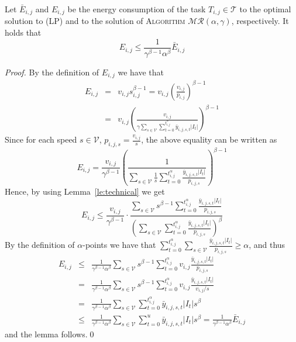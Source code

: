 \documentclass{llncs}
\newcommand{\algomr}{\textsc{Algorithm} $\mathcal{MR}(\alpha,\gamma)$\xspace}
\begin{document}
\begin{lemma}\label{le:speed}
Let $\bar{E}_{i,j}$ and $E_{i,j}$ be the energy consumption of the task $T_{i,j}\in \mathcal{T}$
to the optimal solution to (LP) and to the solution of \algomr, respectively.
It holds that
\begin{equation*}
E_{i,j}\leq \frac{1}{\gamma^{\beta-1}\alpha^{\beta}} \bar{E}_{i,j}
\end{equation*}
\end{lemma}
\begin{proof}
By the definition of $E_{i,j}$ we have that
\begin{eqnarray*}
E_{i,j} & = & v_{i,j}s_{i,j}^{\beta-1}
 = v_{i,j} \left(\frac{v_{i,j}}{p_{i,j}}\right)^{\beta-1}\\
 & = & v_{i,j}\left(\frac{v_{i,j}}{\gamma \sum_{s\in\mathcal{V}}\sum_{t=0}^{t_{i,j}^{\alpha}}\bar{y}_{i,j,s,t}|I_t|}\right)^{\beta-1}
\end{eqnarray*}
Since for each speed $s\in\mathcal{V}$, $p_{i,j,s} = \frac{v_{i,j}}{s}$, the above equality can be written as
\begin{equation*}
E_{i,j} = \frac{v_{i,j}}{\gamma^{\beta-1}}\left(\frac{1}{\sum_{s\in\mathcal{V}}\frac{1}{s}\sum_{t=0}^{t_{i,j}^{\alpha}}\frac{\bar{y}_{i,j,s,t}|I_t|}{p_{i,j,s}}}\right)^{\beta-1}
\end{equation*}
Hence, by using Lemma~\ref{le:technical} we get
\begin{equation*}
E_{i,j} \leq \frac{v_{i,j}}{\gamma^{\beta-1}} \cdot \frac{\sum_{s\in\mathcal{V}}s^{\beta-1}\sum_{t=0}^{t_{i,j}^{\alpha}}\frac{\bar{y}_{i,j,s,t}|I_t|}{p_{i,j,s}}}{\left(\sum_{s\in\mathcal{V}}\sum_{t=0}^{t_{i,j}^{\alpha}}\frac{\bar{y}_{i,j,s,t}|I_t|}{p_{i,j,s}}\right)^{\beta}}
\end{equation*}
By the definition of $\alpha$-points we have that
$\sum_{t=0}^{t_{i,j}^{\alpha}} \sum_{s\in \mathcal{V}}\frac{\bar{y}_{i,j,s,t}|I_t|}{p_{i,j,s}} \geq \alpha$, and thus
\begin{eqnarray*}
E_{i,j} & \leq & \frac{1}{\gamma^{\beta-1}\alpha^{\beta}} \sum_{s\in\mathcal{V}}s^{\beta-1}\sum_{t=0}^{t_{i,j}^{\alpha}}v_{i,j}\frac{\bar{y}_{i,j,s,t}|I_t|}{p_{i,j,s}}\\
 & = & \frac{1}{\gamma^{\beta-1}\alpha^{\beta}} \sum_{s\in\mathcal{V}}s^{\beta-1}\sum_{t=0}^{t_{i,j}^{\alpha}}v_{i,j}\frac{\bar{y}_{i,j,s,t}|I_t|}{v_{i,j}/s} \\
 & = & \frac{1}{\gamma^{\beta-1}\alpha^{\beta}} \sum_{s\in\mathcal{V}}\sum_{t=0}^{t_{i,j}^{\alpha}}\bar{y}_{i,j,s,t}|I_t|s^{\beta}\\
 & \leq & \frac{1}{\gamma^{\beta-1}\alpha^{\beta}} \sum_{s\in\mathcal{V}}\sum_{t=0}^u\bar{y}_{i,j,s,t}|I_t|s^{\beta}
 = \frac{1}{\gamma^{\beta-1}\alpha^{\beta}} \bar{E}_{i,j}
\end{eqnarray*}
and the lemma follows.\qed
\end{proof}
\end{document}
